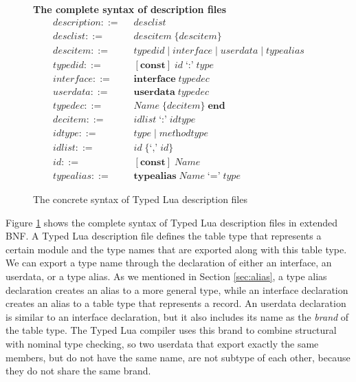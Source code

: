 \begin{figure}[!ht]
\textbf{The complete syntax of description files}\\
\dstart
\begin{align*}
\textit{description} ::= & \;\; \textit{desclist}\\
\textit{desclist} ::= & \;\; \textit{descitem} \; \{ \textit{descitem} \}\\
\textit{descitem} ::= & \;\; \textit{typedid} \; | \;
  \textit{interface} \; | \;
  \textit{userdata} \; | \;
  \textit{typealias}\\
\textit{typedid} ::= & \;\; [\textbf{const}] \; \textit{id} \; \texttt{`:'} \; \textit{type}\\ 
\textit{interface} ::= & \;\; \textbf{interface} \; \textit{typedec}\\
\textit{userdata} ::= & \;\; \textbf{userdata} \; \textit{typedec}\\
\textit{typedec} ::= & \;\; \textit{Name} \; \{\textit{decitem}\} \; \textbf{end}\\
\textit{decitem} ::= & \;\; \textit{idlist} \; \texttt{`:'} \; \textit{idtype}\\
\textit{idtype} ::= & \;\; \textit{type} \; | \; \textit{methodtype}\\
\textit{idlist} ::= & \;\; \textit{id} \; \{\texttt{`,'} \; \textit{id}\}\\
\textit{id} ::= & \;\; [\textbf{const}] \; \textit{Name}\\
\textit{typealias} ::= & \;\; \textbf{typealias} \; \textit{Name} \; \texttt{`='} \; \textit{type}
\end{align*}
\dend
\caption{The concrete syntax of Typed Lua description files}
\label{fig:tldsyntax}
\end{figure}

Figure \ref{fig:tldsyntax} shows the complete syntax of Typed Lua
description files in extended BNF.
A Typed Lua description file defines the table type that represents
a certain module and the type names that are exported
along with this table type.
We can export a type name through the declaration of either an interface,
an userdata, or a type alias.
As we mentioned in Section \ref{sec:alias}, a type alias declaration
creates an alias to a more general type, while an interface declaration
creates an alias to a table type that represents a record.
An userdata declaration is similar to an interface declaration,
but it also includes its name as the \emph{brand} of the table type.
The Typed Lua compiler uses this brand to combine structural with
nominal type checking, so two userdata that export exactly the same members,
but do not have the same name, are not subtype of each other,
because they do not share the same brand.

